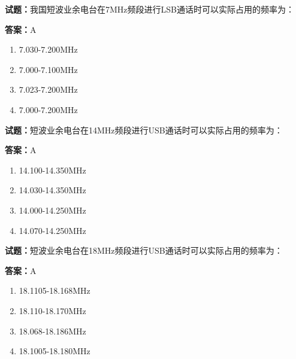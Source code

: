 \documentclass{ctexbook}
\begin{document}




\vspace{1em}

\textbf{试题：}我国短波业余电台在7MHz频段进行LSB通话时可以实际占用的频率为： 

\textbf{答案：}A 

\begin{enumerate}[leftmargin=3em]
  \item 7.030-7.200MHz 

  \item 7.000-7.100MHz 

  \item 7.023-7.200MHz 

  \item 7.000-7.200MHz 

\end{enumerate}





\vspace{1em}

\textbf{试题：}短波业余电台在14MHz频段进行USB通话时可以实际占用的频率为： 

\textbf{答案：}A 

\begin{enumerate}[leftmargin=3em]
  \item 14.100-14.350MHz 

  \item 14.030-14.350MHz 

  \item 14.000-14.250MHz 

  \item 14.070-14.250MHz 

\end{enumerate}





\vspace{1em}

\textbf{试题：}短波业余电台在18MHz频段进行USB通话时可以实际占用的频率为： 

\textbf{答案：}A 

\begin{enumerate}[leftmargin=3em]
  \item 18.1105-18.168MHz 

  \item 18.110-18.170MHz 

  \item 18.068-18.186MHz 

  \item 18.1005-18.180MHz 

\end{enumerate}
\end{document}
